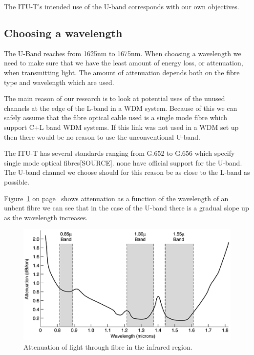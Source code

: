 \documentclass{article}
\begin{document}
The ITU-T's intended use of the U-band corresponds with our own objectives.

\subsection{Choosing a wavelength}
The U-Band reaches from 1625nm to 1675nm. When choosing a wavelength we need to make sure that we have the least amount of energy loss, or attenuation, when transmitting light. The amount of attenuation depends both on the fibre type and wavelength which are used. 

The main reason of our research is to look at potential uses of the unused channels at the edge of the L-band in a WDM system. Because of this we can safely assume that the fibre optical cable used is a single mode fibre which support C+L band WDM systems. If this link was not used in a WDM set up then there would be no reason to use the unconventional U-band.

The ITU-T has several standards ranging from G.652 to G.656 which specify single mode optical fibres[SOURCE]. none have official support for the U-band. The U-band channel we choose should for this reason be as close to the L-band as possible.

Figure~\ref{fig:attenuation} on page~\pageref{fig:attenuation} shows attenuation as a function of the wavelength of an unbent fibre we can see that in the case of the U-band there is a gradual slope up as the wavelength increases.
\begin{figure}[h]
\centerline{\includegraphics[scale=0.5, trim = 0mm 0mm 0mm 0mm]{images/attenuation.png}}
\caption{Attenuation of light through fibre in the infrared region.\cite[fig 2-6]{tannenbaum:networks}}
\label{fig:attenuation}
\end{figure}
\end{document}
